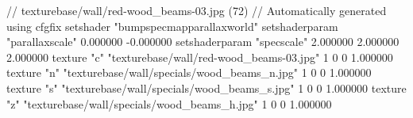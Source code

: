 // texturebase/wall/red-wood_beams-03.jpg (72)
// Automatically generated using cfgfix
setshader "bumpspecmapparallaxworld"
setshaderparam "parallaxscale" 0.000000 -0.000000
setshaderparam "specscale" 2.000000 2.000000 2.000000
texture "c" "texturebase/wall/red-wood_beams-03.jpg" 1 0 0 1.000000
texture "n" "texturebase/wall/specials/wood_beams_n.jpg" 1 0 0 1.000000
texture "s" "texturebase/wall/specials/wood_beams_s.jpg" 1 0 0 1.000000
texture "z" "texturebase/wall/specials/wood_beams_h.jpg" 1 0 0 1.000000

